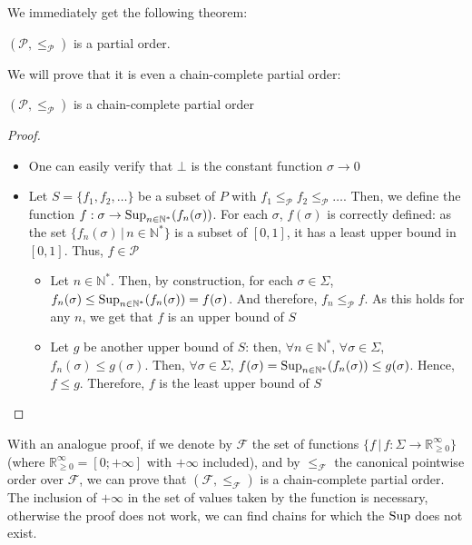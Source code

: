 \documentclass[a4paper,10pt]{llncs}
\def\NN {{\mathbb N}}
\def\RRposi {{\mathbb R_{\geq 0}^{\infty}}}
\def\Sup {\textnormal {Sup}}
\begin{document}
We immediately get the following theorem:
\begin{theorem}
$(\mathcal{P},\leq_{\mathcal{P}})$ is a partial order.
\end{theorem}

We will prove that it is even a chain-complete partial order:
\begin{theorem}
$(\mathcal{P},\leq_{\mathcal{P}})$ is a chain-complete partial order
\end{theorem}
\begin{proof}
\begin{itemize}
\item One can easily verify that $\bot$ is the constant function $\sigma \rightarrow 0$
\item Let $S = \{f_1, f_2, \dots \}$ be a subset of $P$ with $f_1 \leq_{\mathcal{P}} f_2 \leq_{\mathcal{P}} \dots$. Then, we define the function $f : \sigma \rightarrow \Sup_{n \in \NN^*}(f_n(\sigma))$. \newline
For each $\sigma$, $f(\sigma)$ is correctly defined: as the set $\{f_n(\sigma) \,|\, n \in \NN^*\}$ is a  subset of $[0,1]$, it has a least upper bound in $[0,1]$. Thus, $f \in \mathcal{P}$
\begin{itemize}
\item Let $n \in \NN^*$. Then, by construction, for each $\sigma \in \Sigma$, $f_n(\sigma) \leq \Sup_{n \in \NN^*}(f_n(\sigma)) = f(\sigma)$. And therefore, $f_n \leq_{\mathcal{P}} f$. As this holds for any $n$, we get that $f$ is an upper bound of $S$
\item Let $g$ be another upper bound of $S$: then, $\forall n \in \NN^*$, $\forall \sigma \in \Sigma$, $f_n(\sigma) \leq g(\sigma)$. Then, $\forall \sigma \in \Sigma$, $f(\sigma) = \Sup_{n \in \NN^*}(f_n(\sigma)) \leq g(\sigma)$. Hence, $f \leq g$. Therefore, $f$ is the least upper bound of $S$
\end{itemize}
\end{itemize}
\end{proof}
 
 \begin{remark}
 With an analogue proof, if we denote by $\mathcal{F}$ the set of functions $\{f \,|\, f : \Sigma \rightarrow \RRposi\}$ (where $\RRposi = [0;+\infty]$ with $+\infty$ included), and by $\leq_{\mathcal{F}}$ the canonical pointwise order over $\mathcal{F}$, we can prove that $(\mathcal{F},\leq_{\mathcal{F}})$ is a chain-complete partial order. The inclusion of $+\infty$ in the set of values taken by the function is necessary, otherwise the proof does not work, we can find chains for which the $\Sup$ does not exist.
 \end{remark}\bigskip
 
\end{document}
